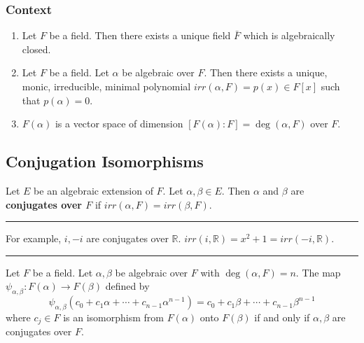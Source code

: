\subsubsection*{Context}
\begin{enumerate}
	\item Let $F$ be a field.
		Then there exists a unique field $\bar{F}$ which is algebraically closed.
	\item Let $F$ be a field.
		Let $\alpha$ be algebraic over $F$.
		Then there exists a unique, monic, irreducible, minimal polynomial $irr(\alpha,F) = p(x) \in F[x]$ such that $p(\alpha) = 0$.
	\item $F(\alpha)$ is a vector space of dimension $[F(\alpha) : F] = \deg (\alpha,F)$ over $F$.
\end{enumerate}

\subsection{Conjugation Isomorphisms}
\begin{definition}[conjugates]
	Let $E$ be an algebraic extension of $F$.
	Let $\alpha,\beta \in E$.
	Then $\alpha$ and $\beta$ are \textbf{conjugates over $F$} if $irr(\alpha,F) = irr(\beta,F)$.
\end{definition}
\hrule\vspace{1em}
For example, $i,-i$ are conjugates over $\mathbb{R}$.
$irr(i,\mathbb{R}) = x^2+1 = irr(-i,\mathbb{R})$.
\hrule\vspace{1em}
\begin{theorem}
	Let $F$ be a field.
	Let $\alpha,\beta$ be algebraic over $F$ with $\deg(\alpha,F) = n$.
	The map $\psi_{\alpha,\beta} : F(\alpha) \to F(\beta)$ defined by 
	\[ \psi_{\alpha,\beta} \left( c_0 + c_1\alpha + \dotsb + c_{n-1}\alpha^{n-1} \right) = c_0 + c_1\beta + \dotsb + c_{n-1}\beta^{n-1} \]
	where $c_j \in F$ is an isomorphism from $F(\alpha)$ onto $F(\beta)$ if and only if $\alpha,\beta$ are conjugates over $F$.
\end{theorem}
